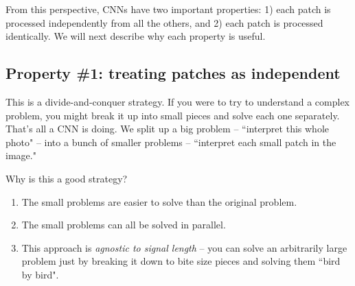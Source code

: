 

From this perspective, CNNs have two important properties: 1) each patch is processed independently from all the others, and 2) each patch is processed identically. We will next describe why each property is useful.


\subsection{Property \#1: treating patches as independent}
This is a divide-and-conquer strategy. If you were to try to understand a complex problem, you might break it up into small pieces and solve each one separately. That's all a CNN is doing. We split up a big problem -- ``interpret this whole photo" -- into a bunch of smaller problems -- ``interpret each small patch in the image."

Why is this a good strategy?
\begin{enumerate}
    \item The small problems are easier to solve than the original problem.
    \item The small problems can all be solved in parallel.
    \item This approach is \textit{agnostic to signal length} -- you can solve an arbitrarily large problem just by breaking it down to bite size pieces and solving them ``bird by bird"\cite{lamott1980}.
\end{enumerate}

